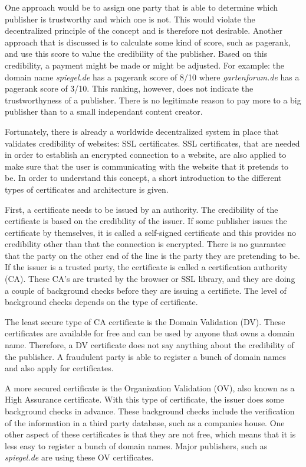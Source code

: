 One approach would be to assign one party that is able to determine which publisher is trustworthy and which one is not. This would violate the decentralized principle of the concept and is therefore not desirable. Another approach that is discussed is to calculate some kind of score, such as pagerank, and use this score to value the credibility of the publisher. Based on this credibility, a payment might be made or might be adjusted. For example: the domain name \textit{spiegel.de} has a pagerank score of 8/10 where \textit{gartenforum.de} has a pagerank score of 3/10. This ranking, however, does not indicate the trustworthyness of a publisher. There is no legitimate reason to pay more to a big publisher than to a small independant content creator. 

Fortunately, there is already a worldwide decentralized system in place that validates credibility of websites: SSL certificates. SSL certificates, that are needed in order to establish an encrypted connection to a website, are also applied to make sure that the user is communicating with the website that it pretends to be. In order to understand this concept, a short introduction to the different types of certificates and architecture is given. 

First, a certificate needs to be issued by an authority. The credibility of the certificate is based on the credibility of the issuer. If some publisher issues the certificate by themselves, it is called a self-signed certificate and this provides no credibility other than that the connection is encrypted. There is no guarantee that the party on the other end of the line is the party they are pretending to be. If the issuer is a trusted party, the certificate is called a certification authority (CA). These CA's are trusted by the browser or SSL library, and they are doing a couple of background checks before they are issuing a certificte. The level of background checks depends on the type of certificate. 

The least secure type of CA certificate is the Domain Validation (DV). These certificates are available for free and can be used by anyone that owns a domain name. Therefore, a DV certificate does not say anything about the credibility of the publisher. A fraudulent party is able to register a bunch of domain names and also apply for certificates.

A more secured certificate is the Organization Validation (OV), also known as a High Assurance certificate. With this type of certificate, the issuer does some background checks in advance. These background checks include the verification of the information in a third party database, such as a companies house. One other aspect of these certificates is that they are not free, which means that it is less easy to register a bunch of domain names. Major publishers, such as \textit{spiegel.de} are using these OV certificates.

